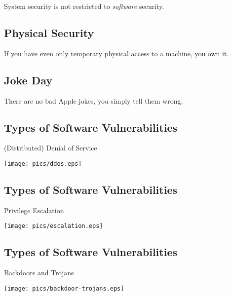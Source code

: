 \documentclass[xga]{xdvislides}
\begin{document}
\Huge
\begin{center}
System security is not restricted to {\em software} security.
\end{center}
\Normalsize

\subsection{Physical Security}
\vspace{.5in}

\Huge
\begin{center}
If you have even only temporary physical access to a machine, you own it.
\end{center}
\Normalsize

\subsection{Joke Day}
\vspace*{\fill}
\begin{center}
\Huge
There are no bad Apple jokes, you simply tell them wrong.
\Normalsize
\end{center}
\vspace*{\fill}


\subsection{Types of Software Vulnerabilities}
(Distributed) Denial of Service
\begin{center}
	\texttt{[image: pics/ddos.eps]}
\end{center}

\subsection{Types of Software Vulnerabilities}
Privilege Escalation
\begin{center}
	\texttt{[image: pics/escalation.eps]}
\end{center}

\subsection{Types of Software Vulnerabilities}
Backdoors and Trojans
\begin{center}
	\texttt{[image: pics/backdoor-trojans.eps]}
\end{center}

%
\end{document}
